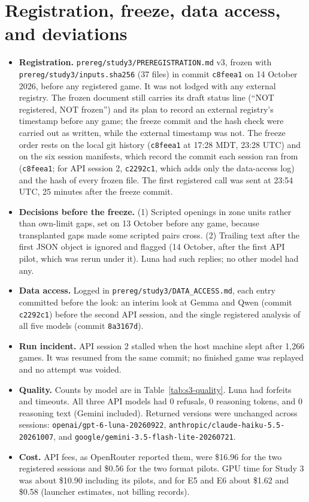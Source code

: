 \section{Registration, freeze, data access, and deviations}
\label{app:reg}

\begin{itemize}
  \item \textbf{Registration.} \texttt{prereg/study3/PREREGISTRATION.md} v3, frozen with \texttt{prereg/study3/inputs.sha256} (37 files) in commit \texttt{c8feea1} on 14 October 2026, before any registered game. It was not lodged with any external registry. The frozen document still carries its draft status line (``NOT registered, NOT frozen'') and its plan to record an external registry's timestamp before any game; the freeze commit and the hash check were carried out as written, while the external timestamp was not. The freeze order rests on the local git history (\texttt{c8feea1} at 17:28 MDT, 23:28 UTC) and on the six session manifests, which record the commit each session ran from (\texttt{c8feea1}; for API session 2, \texttt{c2292c1}, which adds only the data-access log) and the hash of every frozen file. The first registered call was sent at 23:54 UTC, 25 minutes after the freeze commit.
  \item \textbf{Decisions before the freeze.} (1) Scripted openings in zone units rather than own-limit gaps, set on 13 October before any game, because transplanted gaps made some scripted pairs cross. (2) Trailing text after the first JSON object is ignored and flagged (14 October, after the first API pilot, which was rerun under it). Luna had \sThreeTrailingLuna{} such replies; no other model had any.
  \item \textbf{Data access.} Logged in \texttt{prereg/study3/DATA\_ACCESS.md}, each entry committed before the look: an interim look at Gemma and Qwen (commit \texttt{c2292c1}) before the second API session, and the single registered analysis of all five models (commit \texttt{8a3167d}).
  \item \textbf{Run incident.} API session 2 stalled when the host machine slept after 1{,}266 games. It was resumed from the same commit; no finished game was replayed and no attempt was voided.
  \item \textbf{Quality.} Counts by model are in Table~\ref{tab:s3-quality}. Luna had \sThreeForfeitsLuna{} forfeits and \sThreeTimeoutsLuna{} timeouts. All three API models had 0 refusals, 0 reasoning tokens, and 0 reasoning text (Gemini included). Returned versions were unchanged across sessions: \texttt{openai/gpt-6-luna-20260922}, \texttt{anthropic/claude-haiku-5.5-20261007}, and \texttt{google/gemini-3.5-flash-lite-20260721}.
  \item \textbf{Cost.} API fees, as OpenRouter reported them, were \$16.96 for the two registered sessions and \$0.56 for the two format pilots. GPU time for Study 3 was about \$10.90 including its pilots, and for E5 and E6 about \$1.62 and \$0.58 (launcher estimates, not billing records).
\end{itemize}

